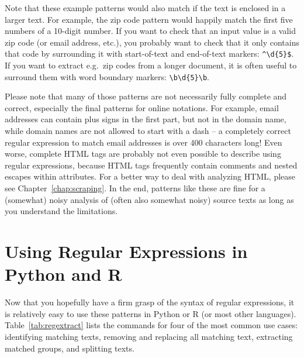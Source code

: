 Note that these example patterns would also match if the text is enclosed in a larger text.
For example, the zip code pattern would happily match the first five numbers of a 10-digit number.
If you want to check that an input value is a valid zip code (or email address, etc.),
you probably want to check that it only contains that code by surrounding it with start-of-text and end-of-text markers: \verb|^\d{5}$|.
If you want to extract e.g.\ zip codes from a longer document, it is often useful to surround them with word boundary markers: \verb|\b\d{5}\b|.

Please note that many of those patterns are not necessarily fully complete and correct, especially the final patterns for online notations.
For example, email addresses can contain plus signs in the first part, but not in the domain name, while domain names are not allowed to start with a dash -- a completely correct regular expression to match email addresses is over 400 characters long!
Even worse, complete HTML tags are probably not even possible to describe using regular expressions, because HTML tags frequently contain comments and nested escapes within attributes.
For a better way to deal with analyzing HTML, please see Chapter~\ref{chap:scraping}. In the end, patterns like these are fine for a (somewhat) noisy analysis of (often also somewhat noisy) source texts as long as you understand the limitations.

\section{Using Regular Expressions in Python and R}\label{sec:regextract}

Now that you hopefully have a firm grasp of the syntax of regular expressions,
it is relatively easy to use these patterns in Python or R (or most other languages).
Table~\ref{tab:regextract} lists the commands for four of the most common use cases:
identifying matching texts, removing and replacing all matching text, extracting matched groups, and splitting texts.

%

